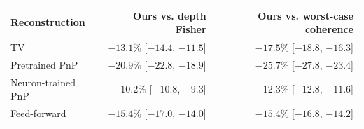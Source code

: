 \begin{tabular}{lrr}
\toprule
Reconstruction & Ours vs. depth Fisher & Ours vs. worst-case coherence \\
\midrule
TV & $-13.1\%$ [$-14.4$, $-11.5$] & $-17.5\%$ [$-18.8$, $-16.3$] \\
Pretrained PnP & $-20.9\%$ [$-22.8$, $-18.9$] & $-25.7\%$ [$-27.8$, $-23.4$] \\
Neuron-trained PnP & $-10.2\%$ [$-10.8$, $-9.3$] & $-12.3\%$ [$-12.8$, $-11.6$] \\
Feed-forward & $-15.4\%$ [$-17.0$, $-14.0$] & $-15.4\%$ [$-16.8$, $-14.2$] \\
\bottomrule
\end{tabular}
